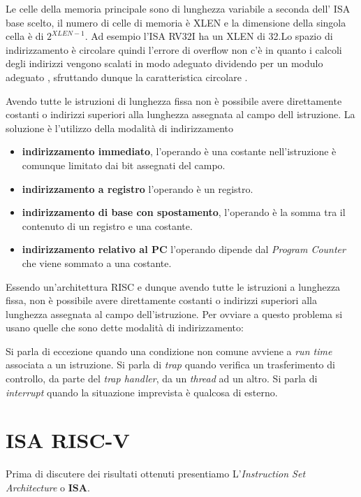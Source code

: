 \documentclass[12pt,a4paper]{report}
\begin{document}
Le celle della memoria principale sono di lunghezza variabile a seconda dell' ISA base scelto, il numero di celle di memoria è XLEN e la dimensione della singola cella è di $2^{XLEN - 1}$. Ad esempio l'ISA RV32I ha un XLEN di 32.Lo spazio di indirizzamento è circolare quindi l'errore di overflow non c'è in quanto i calcoli degli indirizzi vengono scalati in modo adeguato dividendo per un modulo adeguato , sfruttando dunque la caratteristica circolare \cite{ISA}.


Avendo tutte le istruzioni di lunghezza fissa non è possibile avere direttamente costanti o indirizzi superiori alla lunghezza assegnata al campo dell istruzione. La soluzione è l'utilizzo della modalità di indirizzamento
\begin{itemize}
	\item \textbf{indirizzamento immediato}, l’operando è una costante nell’istruzione è comunque limitato dai bit assegnati del campo.
	\item \textbf{indirizzamento a registro} l’operando è un registro.
	\item \textbf{indirizzamento di base con spostamento}, l’operando è la somma tra il
contenuto di un registro e una costante.
\item \textbf{indirizzamento relativo al PC} l'operando dipende dal \textit{Program Counter} che viene sommato a una costante.
\end{itemize}

Essendo un’architettura RISC e dunque avendo tutte le istruzioni a lunghezza fissa, non è possibile avere direttamente costanti o indirizzi superiori alla lunghezza assegnata al campo dell’istruzione. Per ovviare a questo problema si usano quelle che sono dette modalità di indirizzamento:

Si parla di eccezione quando una condizione non comune avviene a \textit{run time} associata a un istruzione.
Si parla di \textit{trap} quando verifica un trasferimento di controllo, da parte del \textit{trap handler}, da un  \textit{thread} ad un altro. Si parla di \textit{interrupt} quando la situazione imprevista è qualcosa di esterno.


% 
\chapter{ISA RISC-V}
Prima di discutere dei risultati ottenuti presentiamo L'\textit{Instruction Set Architecture} o \textbf{ISA}.
\end{document}
